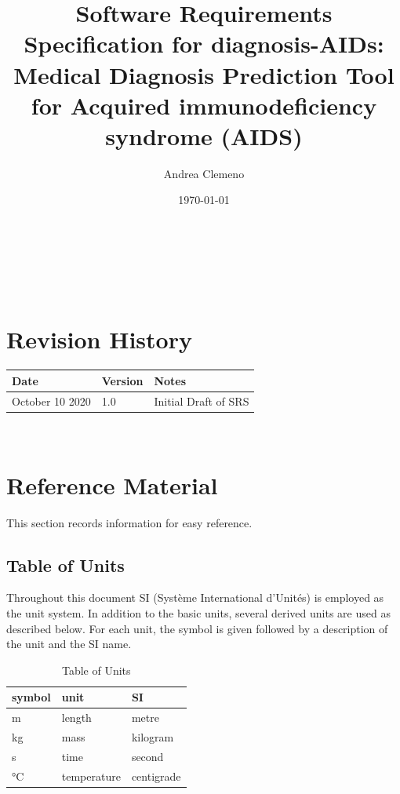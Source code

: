 \documentclass[12pt]{article}
\begin{document}
\title{Software Requirements Specification for diagnosis-AIDs\progname: Medical 
Diagnosis Prediction Tool for Acquired immunodeficiency syndrome (AIDS)} 
\author{Andrea Clemeno}
\date{\today}
	
\maketitle

~\newpage


\tableofcontents

~\newpage

\section*{Revision History}

\begin{tabularx}{\textwidth}{p{3cm}p{2cm}X}
\toprule {\bf Date} & {\bf Version} & {\bf Notes}\\
\midrule
October 10 2020 & 1.0 & Initial Draft of SRS\\
\bottomrule
\end{tabularx}

~\newpage

\section{Reference Material}

This section records information for easy reference.

\subsection{Table of Units}

Throughout this document SI (Syst\`{e}me International d'Unit\'{e}s) is employed
as the unit system.  In addition to the basic units, several derived units are
used as described below.  For each unit, the symbol is given followed by a
description of the unit and the SI name.
~\newline

\renewcommand{\arraystretch}{1.2}
\begin{table}[ht]
\begin{center}
 \noindent \begin{tabular}{l l l}
    \toprule		
    \textbf{symbol} & \textbf{unit} & \textbf{SI}\\
    \midrule 
    \si{\metre} & length & metre\\
    \si{\kilogram} & mass	& kilogram\\
    \si{\second} & time & second\\
    \si{\celsius} & temperature & centigrade\\
    \bottomrule
  \end{tabular}
  \end{center}
  	\caption{Table of Units}
\end{table}
\end{document}
